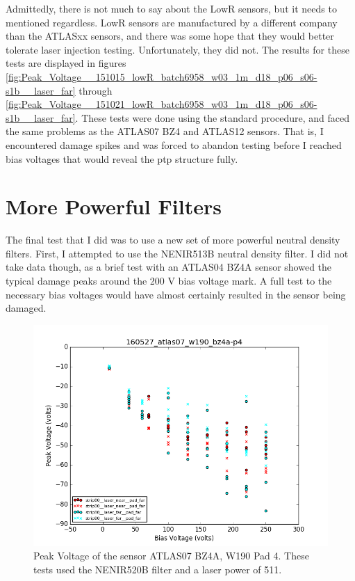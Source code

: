 \documentclass{report}
\begin{document}
            Admittedly, there is not much to say about the LowR sensors, but it needs to mentioned regardless. LowR sensors are manufactured by a different company than the ATLASxx sensors, and there was some hope that they would better tolerate laser injection testing. Unfortunately, they did not. The results for these tests are displayed in figures \ref{fig:Peak_Voltage__151015_lowR_batch6958_w03_1m_d18_p06_s06-s1b__laser_far} through \ref{fig:Peak_Voltage__151021_lowR_batch6958_w03_1m_d18_p06_s06-s1b__laser_far}. These tests were done using the standard procedure, and faced the same problems as the ATLAS07 BZ4 and ATLAS12 sensors. That is, I encountered damage spikes and was forced to abandon testing before I reached bias voltages that would reveal the ptp structure fully.



        \section{More Powerful Filters} \label{sect:new_filters}
            The final test that I did was to use a new set of more powerful neutral density filters. First, I attempted to use the NENIR513B neutral density filter. I did not take data though, as a brief test with an ATLAS04 BZ4A sensor showed the typical damage peaks around the 200 V bias voltage mark. A full test to the necessary bias voltages would have almost certainly resulted in the sensor being damaged.  

            \begin{figure}[h] 
                \includegraphics[height=.4\textheight]{160527_atlas07_w190_bz4a-p4}
                \centering
                \caption{ Peak Voltage of the sensor ATLAS07 BZ4A, W190 Pad 4. These tests used the NENIR520B filter and a laser power of 511. }
                \label{fig:160527_atlas07_w190_bz4a-p4}
            \end{figure}
\end{document}
